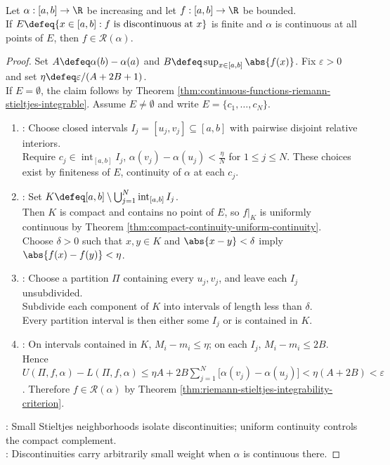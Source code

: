 \begin{theorem} \label{thm:finitely-many-discontinuities-integrable} \\
Let $\alpha:[a,b]\to\R$ be increasing and let $f:[a,b]\to\R$ be bounded.\\
If $E\defeq\{x\in[a,b]:f\text{ is discontinuous at }x\}$ is finite and $\alpha$ is continuous at all points of $E$, then $f\in\mathcal{R}(\alpha)$.
\begin{proof}
Set $A\defeq\alpha(b)-\alpha(a)$ and $B\defeq\sup_{x\in[a,b]}\abs{f(x)}$. Fix $\varepsilon>0$ and set $\eta\defeq\varepsilon/(A+2B+1)$.\\
If $E=\emptyset$, the claim follows by Theorem \ref{thm:continuous-functions-riemann-stieltjes-integrable}. Assume $E\neq\emptyset$ and write $E=\{c_1,\ldots,c_N\}$.
\begin{enumerate}[label=(\roman*)]
\setlength{\itemsep}{0pt}
\item {}: Choose closed intervals $I_j=[u_j,v_j]\subseteq[a,b]$ with pairwise disjoint relative interiors.\\
Require $c_j\in\operatorname{int}_{[a,b]}I_j$, $\alpha(v_j)-\alpha(u_j)<\frac{\eta}{N}$ for $1\leq j\leq N$. These choices exist by finiteness of $E$, continuity of $\alpha$ at each $c_j$.
\item {}: Set $K\defeq[a,b]\setminus\bigcup_{j=1}^{N}\operatorname{int}_{[a,b]}I_j$.\\
Then $K$ is compact and contains no point of $E$, so $f|_K$ is uniformly continuous by Theorem \ref{thm:compact-continuity-uniform-continuity}.\\
Choose $\delta>0$ such that $x,y\in K$ and $\abs{x-y}<\delta$ imply $\abs{f(x)-f(y)}<\eta$.
\item {}: Choose a partition $\Pi$ containing every $u_j,v_j$, and leave each $I_j$ unsubdivided.\\
Subdivide each component of $K$ into intervals of length less than $\delta$.\\
Every partition interval is then either some $I_j$ or is contained in $K$.
\item {}: On intervals contained in $K$, $M_i-m_i\leq\eta$; on each $I_j$, $M_i-m_i\leq2B$.\\
Hence $U(\Pi,f,\alpha)-L(\Pi,f,\alpha) \leq\eta A+2B\sum\limits_{j=1}^{N}\bigl[\alpha(v_j)-\alpha(u_j)\bigr] <\eta(A+2B)<\varepsilon$. Therefore $f\in\mathcal{R}(\alpha)$ by Theorem \ref{thm:riemann-stieltjes-integrability-criterion}.
\end{enumerate}
: Small Stieltjes neighborhoods isolate discontinuities; uniform continuity controls the compact complement.\\
: Discontinuities carry arbitrarily small weight when $\alpha$ is continuous there.
\end{proof}
\end{theorem}

